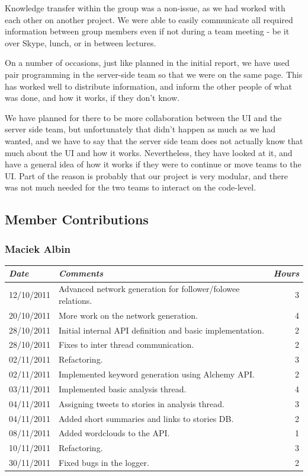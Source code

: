 \documentclass[a4paper,12pt]{article}
\begin{document}
		Knowledge transfer within the group was a non-issue, as we had worked with each other on another project. We were able to easily communicate all required information between group members even if not during a team meeting - be it over Skype, lunch, or in between lectures.
		
		On a number of occasions, just like planned in the initial report, we have used pair programming in the server-side team so that we were on the same page. This has worked well to distribute information, and inform the other people of what was done, and how it works, if they don't know. 
		
		We have planned for there to be more collaboration between the UI and the server side team, but unfortunately that didn't happen as much as we had wanted, and we have to say that the server side team does not actually know that much about the UI and how it works. Nevertheless, they have looked at it, and have a general idea of how it works if they were to continue or move teams to the UI. Part of the reason is probably that our project is very modular, and there was not much needed for the two teams to interact on the code-level.
	
	\subsection{Member Contributions}
	  \subsubsection{Maciek Albin}
	    \begin{tabular}{l | p{10cm} r}
	     \emph{\large Date} & \emph{\large Comments} & \emph{\large Hours}\\
	     \hline
	     12/10/2011 & Advanced network generation for follower/folowee relations. & 3\\
	     20/10/2011 & More work on the network generation. & 4\\
	     28/10/2011 & Initial internal API definition and basic implementation. & 2\\
	     28/10/2011 & Fixes to inter thread communication. & 2\\
	     02/11/2011 & Refactoring. & 3\\
	     02/11/2011 & Implemented keyword generation using Alchemy API. & 2\\
	     03/11/2011 & Implemented basic analysis thread. & 4\\
	     04/11/2011 & Assigning tweets to stories in analysis thread. & 3\\
	     04/11/2011 & Added short summaries and links to stories DB. & 2\\
	     08/11/2011 & Added wordclouds to the API. & 1\\
	     10/11/2011 & Refactoring. & 3\\
	     30/11/2011 & Fixed bugs in the logger. & 2
	    \end{tabular}
	    
\end{document}
